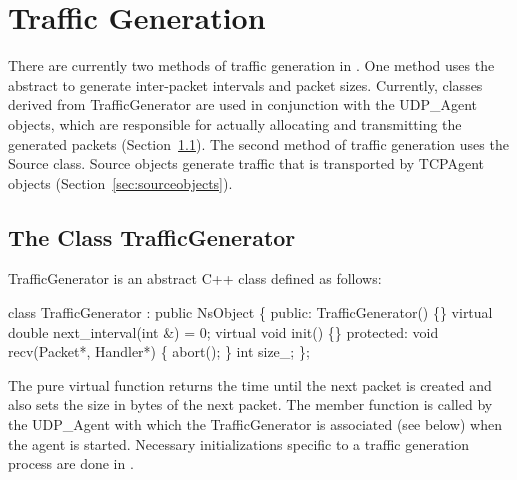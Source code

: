 




\chapter{Traffic Generation}
\label{chap:trafgen}

There are currently two methods of traffic generation in \ns.
One method uses the abstract
to generate inter-packet intervals and packet sizes.
Currently, classes derived
from TrafficGenerator are used in conjunction with the UDP\_Agent
objects, which are responsible for actually allocating and
transmitting the generated packets (Section~\ref{sec:trafgenclass}).
The second method of traffic generation uses the Source class.
Source objects generate traffic that is transported by TCPAgent objects
(Section~\ref{sec:sourceobjects}).

\section{The Class TrafficGenerator}
\label{sec:trafgenclass}

TrafficGenerator is an abstract C++ class defined as follows:
\begin{program}
        class TrafficGenerator : public NsObject \{
        public:
                TrafficGenerator() \{\}
                virtual double next_interval(int &) = 0;
                virtual void init() \{\}
        protected:
                void recv(Packet*, Handler*) \{ abort(); \}
                int size_;
        \};
\end{program}
The pure virtual function  returns the time until the
next packet is created and also sets the size in bytes of the next
packet.
The member function  is called by the UDP\_Agent with
which the TrafficGenerator is associated (see below) when the agent is
started.
Necessary initializations specific to a traffic generation
process are done in .

